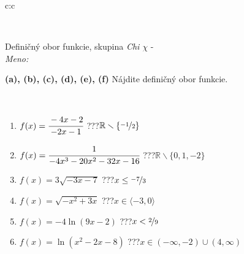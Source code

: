 \documentclass[10pt]{report}
\begin{document}
\begin{tabular}{c:c}
\begin{minipage}[c][104.5mm][t]{0.5\linewidth}
\begin{center}
\begin{minipage}{0.20\linewidth}
\begin{center}
\end{center}
\end{minipage}
\end{center}
\end{minipage}
\\ \hdashline
\begin{minipage}[c][104.5mm][t]{0.5\linewidth}
\begin{center}
\vspace{7mm}
{\huge Definičný obor funkcie, skupina \textit{Chi $\chi$} -}\\[5mm]
\textit{Meno:}\phantom{xxxxxxxxxxxxxxxxxxxxxxxxxxxxxxxxxxxxxxxxxxxxxxxxxxxxxxxxxxxxxxxxx}\\[5mm]
\begin{minipage}{0.95\linewidth}
\begin{center}
{
\textbf{(a), (b), (c), (d), (e), (f)} Nájdite definičný obor funkcie. \\[1mm]
\phantom{x}
}
\end{center}
\end{minipage}
\\[4mm]
\begin{minipage}{0.79\linewidth}
\begin{center}
\begin{varwidth}{\linewidth}
\begin{enumerate}
\normalsizerrr
\item $f(x)=\cfrac{-4x-2}{-2x-1}$\quad \dotfill\; ???\;\dotfill \quad $ \mathbb{R} \smallsetminus\{\nicefrac{-1}{2} \}$
\item $f(x)=\cfrac{1}{-4x^3-20x^2-32x-16}$\quad \dotfill\; ???\;\dotfill \quad $ \mathbb{R} \smallsetminus\{0,1,-2 \}$
\item $f(x)=3\sqrt{-3x-7}$\quad \dotfill\; ???\;\dotfill \quad $x\leq\nicefrac{-7}{3}$
\item $f(x)=\sqrt{-x^2+3x}$\quad \dotfill\; ???\;\dotfill \quad $x\in\langle-3 , 0\rangle$
\item $f(x)=-4\ln{(9x-2)}$\quad \dotfill\; ???\;\dotfill \quad $x<\nicefrac{2}{9}$
\item $f(x)=\ln{(x^2-2x-8)}$\quad \dotfill\; ???\;\dotfill \quad $x\in(-\infty , -2)\cup(4 , \infty)$
\end{enumerate}
\end{varwidth}
\end{center}
\end{minipage}
\begin{minipage}{0.20\linewidth}
\begin{center}

\end{center}
\end{minipage}
\end{center}
\end{minipage}
\end{tabular}
\end{document}
